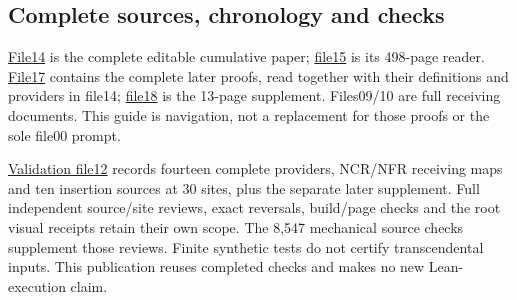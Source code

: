 \documentclass[
]{article}
\begin{document}
\subsection{Complete sources, chronology and
checks}\label{complete-sources-chronology-and-checks}

\href{https://github.com/KokunoYumeto/zeta-function-research-reader/blob/28e540812ca5d45e8943395e460799888b4e5348/workbenches/splitzero-tandem/continuations/20260915-native-conductor-continuation/14_CURRENT_KERNEL_AND_MULTIPLICITY_PROOFS.tex}{File14}
is the complete editable cumulative paper;
\href{https://github.com/KokunoYumeto/zeta-function-research-reader/blob/28e540812ca5d45e8943395e460799888b4e5348/workbenches/splitzero-tandem/continuations/20260915-native-conductor-continuation/15_CURRENT_MIXED_CONTROL_READER.pdf}{file15}
is its 498-page reader.
\href{https://github.com/KokunoYumeto/zeta-function-research-reader/blob/28e540812ca5d45e8943395e460799888b4e5348/workbenches/splitzero-tandem/continuations/20260915-native-conductor-continuation/17_FULL_PRIMITIVE_CONNECTING_PROOFS.tex}{File17}
contains the complete later proofs, read together with their definitions
and providers in file14;
\href{https://github.com/KokunoYumeto/zeta-function-research-reader/blob/28e540812ca5d45e8943395e460799888b4e5348/workbenches/splitzero-tandem/continuations/20260915-native-conductor-continuation/18_PRIMITIVE_CONNECTING_READER.pdf}{file18}
is the 13-page supplement. Files09/10 are full receiving documents. This
guide is navigation, not a replacement for those proofs or the sole
file00 prompt.

\href{https://github.com/KokunoYumeto/zeta-function-research-reader/blob/28e540812ca5d45e8943395e460799888b4e5348/workbenches/splitzero-tandem/continuations/20260915-native-conductor-continuation/12_VALIDATION.md}{Validation
file12} records fourteen complete providers, NCR/NFR receiving maps and
ten insertion sources at 30 sites, plus the separate later supplement.
Full independent source/site reviews, exact reversals, build/page checks
and the root visual receipts retain their own scope. The 8,547
mechanical source checks supplement those reviews. Finite synthetic
tests do not certify transcendental inputs. This publication reuses
completed checks and makes no new Lean-execution claim.
\end{document}

